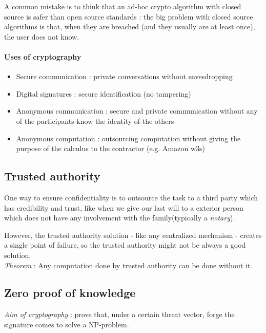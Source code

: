 A common mistake is to think that an ad-hoc crypto algorithm with closed source is safer than open source standards : the big problem with closed source algorithms is that, when they are breached (and they usually are at least once), the user does not know.

\paragraph{Uses of cryptography}
\begin{itemize}
		\item Secure communication : private conversations without eavesdropping 
		\item Digital signatures : secure identification (no tampering)
		\item Anonymous communication : secure and private communication without any of the participants know the identity of the others  
		\item Anonymous computation : outsourcing computation without giving the purpose of the calculus to the contractor (e.g. Amazon w3s)\\
\end{itemize}

\subsection{Trusted authority}

One way to ensure confidentiality is to outsource the task to a third party which has credibility and trust, like when we give our last will to a exterior person which does not have any involvement with the family(typically a \emph{notary}).

However, the trusted authority solution - like any centralized mechanism -  creates a single point of failure, so the trusted authority might not be always a good solution. \\

\emph{Theorem} : Any computation done by trusted authority can be done without it.\\


\subsection{ Zero proof of knowledge }

\textit{Aim of cryptography} : prove that, under a certain threat vector, forge the signature comes to solve a NP-problem. \\

